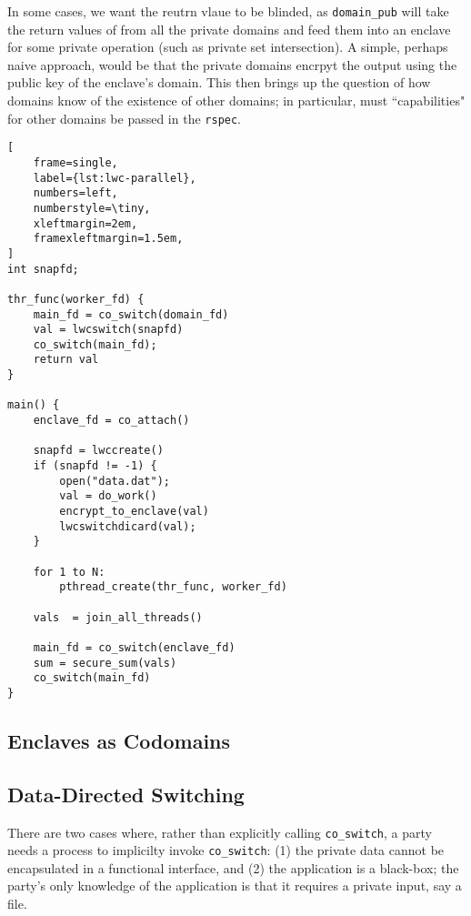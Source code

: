 In some cases, we want the reutrn vlaue to be blinded, as \texttt{domain\_pub}
will take the return values of from all the private domains and feed them into
an enclave for some private operation (such as private set intersection).  
%
A simple, perhaps naive approach, would be that the private domains encrpyt the
output using the public key of the enclave's domain.
%
This then brings up the question of how domains know of the existence of other
domains; in particular, must ``capabilities" for other domains be passed in the
\texttt{rspec}.


\begin{lstlisting}[
    frame=single,
    label={lst:lwc-parallel},
    numbers=left,
    numberstyle=\tiny,
    xleftmargin=2em,
    framexleftmargin=1.5em,
]
int snapfd;

thr_func(worker_fd) {
    main_fd = co_switch(domain_fd)
    val = lwcswitch(snapfd)
    co_switch(main_fd);
    return val
}

main() {
    enclave_fd = co_attach()

    snapfd = lwccreate()
    if (snapfd != -1) {
        open("data.dat");
        val = do_work()
        encrypt_to_enclave(val)
        lwcswitchdicard(val);
    } 

    for 1 to N:
        pthread_create(thr_func, worker_fd)
            
    vals  = join_all_threads()
     
    main_fd = co_switch(enclave_fd)
    sum = secure_sum(vals)
    co_switch(main_fd)
}
\end{lstlisting}


\subsection{Enclaves as Codomains}
\label{sec:enclaves-as-codomains}



\subsection{Data-Directed Switching}
\label{sec:data-directed-switching}

There are two cases where, rather than explicitly calling
\texttt{co\_switch}, a party needs a process to implicilty invoke
\texttt{co\_switch}: (1) the private data cannot be encapsulated in a
functional interface, and (2) the application is a black-box; the
party's only knowledge of the application is that it requires a private input,
say a file.


